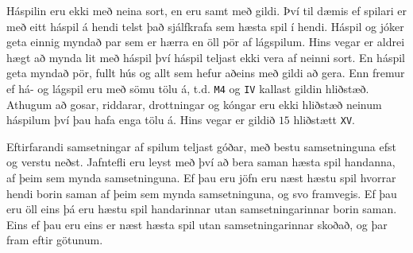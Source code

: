 Háspilin eru ekki með neina sort, en eru samt með gildi. Því til dæmis ef spilari er með eitt háspil á hendi telst það sjálfkrafa
sem hæsta spil í hendi. Háspil og jóker geta einnig myndað par sem er hærra en öll pör af lágspilum. Hins vegar er aldrei hægt
að mynda lit með háspil því háspil teljast ekki vera af neinni sort. En háspil geta myndað pör, fullt hús og allt sem hefur aðeins
með gildi að gera. Enn fremur ef há- og lágspil eru með sömu tölu á, t.d. \texttt{M4} og \texttt{IV} kallast gildin hliðstæð. 
Athugum að gosar, riddarar, drottningar og kóngar eru ekki hliðstæð neinum háspilum því þau hafa enga tölu á. 
Hins vegar er gildið $15$ hliðstætt \texttt{XV}.

Eftirfarandi samsetningar af spilum teljast góðar, með bestu samsetninguna efst og verstu neðst. Jafntefli eru leyst með því að
bera saman hæsta spil handanna, af þeim sem mynda samsetninguna. Ef þau eru jöfn eru næst hæstu spil hvorrar hendi borin saman af þeim
sem mynda samsetninguna, og svo framvegis. Ef þau eru öll eins þá eru hæstu spil handarinnar utan samsetningarinnar borin saman. Eins
ef þau eru eins er næst hæsta spil utan samsetningarinnar skoðað, og þar fram eftir götunum.

